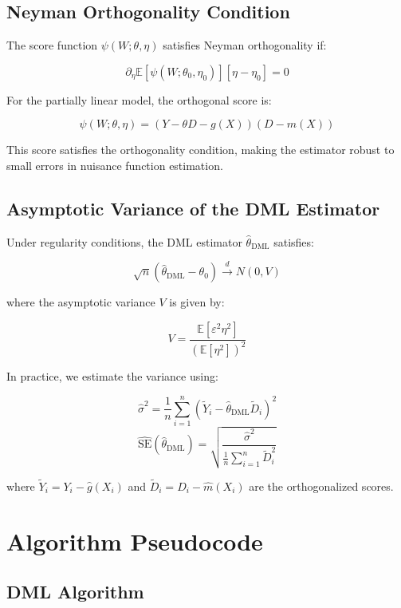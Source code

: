 \subsection{Neyman Orthogonality Condition}

The score function $\psi(W; \theta, \eta)$ satisfies Neyman orthogonality if:

\[
\partial_\eta \mathbb{E}[\psi(W; \theta_0, \eta_0)] [\eta - \eta_0] = 0
\]

For the partially linear model, the orthogonal score is:

\[
\psi(W; \theta, \eta) = (Y - \theta D - g(X))(D - m(X))
\]

This score satisfies the orthogonality condition, making the estimator robust to small errors in nuisance function estimation.

\subsection{Asymptotic Variance of the DML Estimator}

Under regularity conditions, the DML estimator $\hat{\theta}_{\text{DML}}$ satisfies:

\[
\sqrt{n} (\hat{\theta}_{\text{DML}} - \theta_0) \xrightarrow{d} N(0, V)
\]

where the asymptotic variance $V$ is given by:

\[
V = \frac{\mathbb{E}[\varepsilon^2 \eta^2]}{(\mathbb{E}[\eta^2])^2}
\]

In practice, we estimate the variance using:

\[
\hat{\sigma}^2 = \frac{1}{n} \sum_{i=1}^n (\tilde{Y}_i - \hat{\theta}_{\text{DML}} \tilde{D}_i)^2
\]
\[
\widehat{\text{SE}}(\hat{\theta}_{\text{DML}}) = \sqrt{\frac{\hat{\sigma}^2}{\frac{1}{n} \sum_{i=1}^n \tilde{D}_i^2}}
\]

where $\tilde{Y}_i = Y_i - \hat{g}(X_i)$ and $\tilde{D}_i = D_i - \hat{m}(X_i)$ are the orthogonalized scores.

\section{Algorithm Pseudocode}

\subsection{DML Algorithm}


